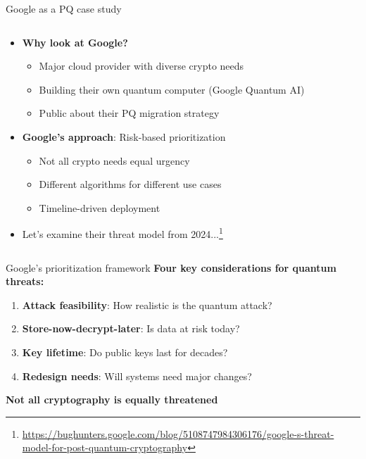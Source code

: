 \documentclass[aspectratio=169, lualatex, handout]{beamer}
\begin{document}
\begin{frame}{Google as a PQ case study}
	\begin{columns}[c]
		\begin{column}{1\textwidth}
			\begin{itemize}
				\item \textbf{Why look at Google?}
				      \begin{itemize}
					      \item Major cloud provider with diverse crypto needs
					      \item Building their own quantum computer (Google Quantum AI)
					      \item Public about their PQ migration strategy
				      \end{itemize}
				\item \textbf{Google's approach}: Risk-based prioritization
				      \begin{itemize}
					      \item Not all crypto needs equal urgency
					      \item Different algorithms for different use cases
					      \item Timeline-driven deployment
				      \end{itemize}
				\item Let's examine their threat model from 2024...\footnote{\url{https://bughunters.google.com/blog/5108747984306176/google-s-threat-model-for-post-quantum-cryptography}}
			\end{itemize}
		\end{column}
	\end{columns}
\end{frame}

\begin{frame}{Google's prioritization framework}
	\textbf{Four key considerations for quantum threats:}
	\begin{enumerate}
		\item \textbf{Attack feasibility}: How realistic is the quantum attack?
		\item \textbf{Store-now-decrypt-later}: Is data at risk today?
		\item \textbf{Key lifetime}: Do public keys last for decades?
		\item \textbf{Redesign needs}: Will systems need major changes?
	\end{enumerate}
	\vspace{5mm}
	\begin{center}
		\textbf{Not all cryptography is equally threatened}
	\end{center}
\end{frame}
\end{document}
